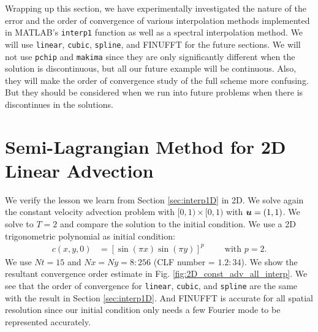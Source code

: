 \documentclass[11pt,letterpaper]{article}
\begin{document}
Wrapping up this section, we have experimentally investigated the nature of the error and the order of convergence of various interpolation methods implemented in MATLAB's \texttt{interp1} function as well as a spectral interpolation method. We will use \texttt{linear}, \texttt{cubic}, \texttt{spline}, and FINUFFT for the future sections. We will not use \texttt{pchip} and \texttt{makima} since they are only significantly different when the solution is discontinuous, but all our future example will be continuous. Also, they will make the order of convergence study of the full \sml\;scheme more confusing. But they should be considered when we run into future problems when there is discontinues in the solutions. 


\section{Semi-Lagrangian Method for 2D Linear Advection}\label{sec:linear_adv}
We verify the lesson we learn from Section \ref{sec:interp1D} in 2D. We solve again the constant velocity advection problem with $[0,1)\times [0,1)$ with $\boldsymbol{u} = (1,1)$. We solve to $T = 2$ and compare the solution to the initial condition. We use a 2D trigonometric polynomial as initial condition:
\begin{align*}
    c(x,y,0) &= [\sin(\pi x)\sin(\pi y)]^p \hspace{1cm}\text{with }p = 2.
\end{align*}
We use $Nt = 15$ and $Nx = Ny = 8:256$ (CLF number = $1.2:34$). We show the resultant convergence order estimate in Fig. \ref{fig:2D_const_adv_all_interp}. We see that the order of convergence for \texttt{linear}, \texttt{cubic}, and \texttt{spline} are the same with the result in Section \ref{sec:interp1D}. And FINUFFT is accurate for all spatial resolution since our initial condition only needs a few Fourier mode to be represented accurately. 
\end{document}
